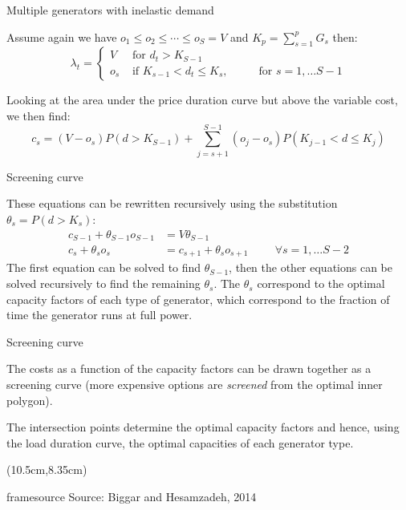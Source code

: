 \documentclass[10pt,aspectratio=169,dvipsnames]{beamer}
\def\l{\lambda}
\newcommand{\source}[1]{\begin{textblock*}{5cm}(10.5cm,8.35cm)
    \begin{beamercolorbox}[ht=0.5cm,right]{framesource}
        \usebeamerfont{framesource}\usebeamercolor[fg]{framesource} Source: {#1}
    \end{beamercolorbox}
\end{textblock*}}
\begin{document}
\begin{frame}{Multiple generators with inelastic demand}

  Assume again we have $o_1 \leq o_2 \leq \cdots \leq o_S = V$ and $K_p = \sum_{s=1}^p G_s$
  then:
  \begin{equation*}
    \l_t = \left\{ \begin{array}{ll}
      V& \textrm{ for } d_t > K_{S-1} \\
      o_s & \textrm{ if } K_{s-1} < d_t \leq K_s, \hspace{1cm} \textrm{ for } s = 1, \dots S-1
    \end{array}\right.
  \end{equation*}

  Looking at the area under the price duration curve but above the
  variable cost, we then find:
  \begin{equation*}
    c_s = (V-o_s)P(d>K_{S-1}) + \sum_{j=s+1}^{S-1} (o_j-o_s) P(K_{j-1} < d \leq K_j)
  \end{equation*}


\end{frame}


\begin{frame}{Screening curve}

  These equations can be rewritten recursively using the substitution
  $\theta_s = P(d > K_s)$:
  \begin{align*}
    c_{S-1} + \theta_{S-1} o_{S-1} &= V\theta_{S-1} \\
    c_s + \theta_s o_s &= c_{s+1} + \theta_s o_{s+1} \hspace{1cm} \forall s = 1, \dots S-2
  \end{align*}
  The first equation can be solved to find $\theta_{S-1}$, then the other equations can be solved recursively to find the remaining $\theta_s$. The $\theta_s$ correspond to the optimal \alert{capacity factors} of each type of generator, which correspond to the fraction  of time the generator runs at full power.


\end{frame}


\begin{frame}{Screening curve}

  The costs as a function of the capacity factors can be drawn
  together as a \alert{screening curve} (more expensive options are
  \emph{screened} from the optimal inner polygon).

  The intersection points determine the optimal capacity factors and hence, using the load duration curve, the optimal capacities of each generator type.

  \centering

  \source{Biggar and Hesamzadeh, 2014}
\end{frame}
\end{document}
